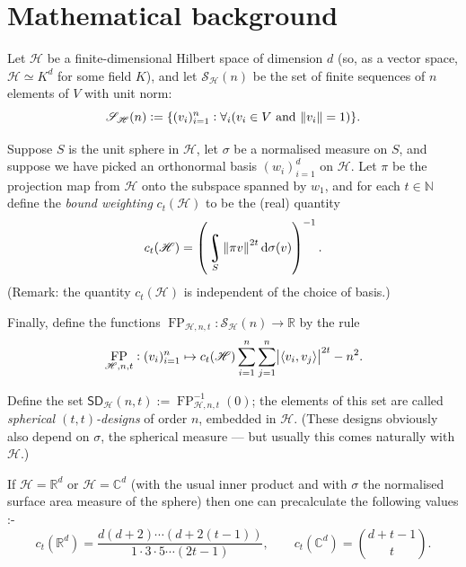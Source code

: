 \documentclass{article}
\newcommand{\C}{\mathbb{C}}
\newcommand{\R}{\mathbb{R}}
\newcommand{\N}{\mathbb{N}}
\newcommand{\scrS}{\mathscr{S}}
\newcommand{\scrH}{\mathscr{H}}
\newcommand{\SD}{\mathsf{SD}}
\DeclareMathOperator{\FP}{FP}
\DeclarePairedDelimiter{\inp}{\langle}{\rangle}
\DeclareMathOperator*{\rint}{\scalerel*{\rotatebox{17}{$\!\int\!$}}{\int}}
\newcommand{\df}{\textit}
\theoremstyle{definition}
\begin{document}
  \section{Mathematical background}
  Let $ \scrH $ be a finite-dimensional Hilbert space of dimension $ d $ (so, as a vector space,
  $ \scrH \simeq K^d $ for some field $ K $), and let $ \scrS_\scrH(n) $ be the set of finite
  sequences of $ n $ elements of $ V $ with unit norm:
  \begin{displaymath}
    \scrS_\scrH(n) := \{ (v_i)_{i = 1}^n : \forall_i (v_i \in V \text{ and } \norm{v_i} = 1) \}.
  \end{displaymath}

  Suppose $ S $ is the unit sphere in $ \scrH $, let $ \sigma $ be a normalised measure
  on $ S $, and suppose we have picked an orthonormal basis $ (w_i)_{i = 1}^d $ on $ \scrH $.
  Let $ \pi $ be the projection map from $ \scrH $ onto the subspace spanned by $ w_1 $,
  and for each $ t \in \N $ define the \df{bound weighting} $ c_t(\scrH) $ to be the (real) quantity
  \begin{displaymath}
    c_t(\scrH) = \left(\rint_S \norm{\pi v}^{2t} \dif{\sigma(v)}\right)^{-1}.
  \end{displaymath}
  (Remark: the quantity $ c_t(\scrH) $ is independent of the choice of basis.)

  Finally, define the functions $ \FP_{\scrH,n,t} : \scrS_\scrH(n) \to \R $ by the rule
  \begin{equation}\label{eqn:fp}
    \FP_{\scrH,n,t} : (v_i)_{i = 1}^n \mapsto
          c_t(\scrH) \sum_{i = 1}^n \sum_{j = 1}^n \abs{\inp{v_i, v_j}}^{2t}
            - n^2.
  \end{equation}

  Define the set $ \SD_\scrH(n,t) := \FP_{\scrH,n,t}^{-1}(0) $; the elements of this set
  are called \df{spherical $ (t,t)$-designs} of order $ n $, embedded in $ \scrH $. (These
  designs obviously also depend on $ \sigma $, the spherical measure --- but usually this
  comes naturally with $ \scrH $.)

  If $ \scrH = \R^d $ or $ \scrH = \C^d $ (with the usual inner product and with $ \sigma $
  the normalised surface area measure of the sphere) then one can precalculate the following
  values \autocite[122]{waldron2018}:-
  \begin{displaymath}
    c_t(\R^d) = \frac{d(d+2)\cdots(d+ 2(t-1))}{1\cdot3\cdot5\cdots(2t-1)},
    \qquad
    c_t(\C^d) = \binom{d+t-1}{t}.
  \end{displaymath}
\end{document}
